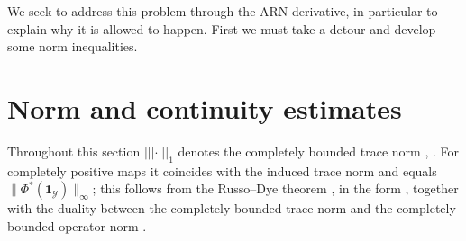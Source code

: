 We seek to address this problem through the ARN derivative, in particular to explain why it is allowed to happen. First we must take a detour and develop some norm inequalities. 
 
\section{Norm and continuity estimates}\label{cont:sec:norms}
 
Throughout this section $|||\cdot|||_1$ denotes the completely bounded trace norm \cite{Kitaev1997}, \cite[Section~3.3.2]{watrous2018theory}. For completely positive maps it coincides with the induced trace norm and equals $\|\Phi^*(\mathbf{1}_{\mathcal{Y}})\|_\infty$; this follows from the Russo--Dye theorem \cite{RussoDye1966}, in the form \cite[Proposition~3.6]{Paulsen2003}, together with the duality between the completely bounded trace norm and the completely bounded operator norm \cite[Theorem~3]{johnston2009computing}.
 
